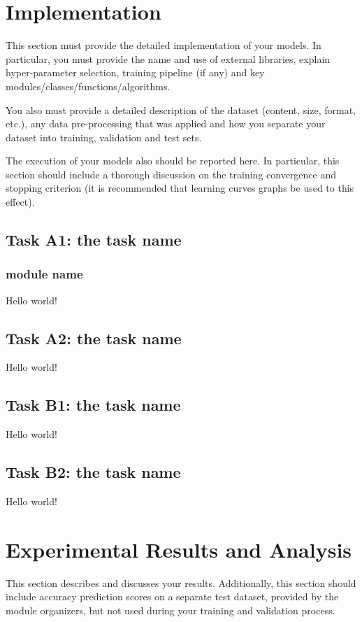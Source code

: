 \documentclass{article}
\begin{document}
\section{Implementation}
\label{sec:implementation_of_models}
    This section must provide the detailed implementation of your models. In particular, you must provide the name and use of external libraries, explain hyper-parameter selection, training pipeline (if any) and key modules/classes/functions/algorithms.
    
    You also must provide a detailed description of the dataset (content, size, format, etc.), any data pre-processing that was applied and how you separate your dataset into training, validation and test sets.
    
    The execution of your models also should be reported here. In particular, this section should include a thorough discussion on the training convergence and stopping criterion (it is recommended that learning curves graphs be used to this effect).

    \subsection{Task A1: the task name}
    \label{ssec:models_A1}
    \subsubsection{module name}
    Hello world!
    \subsection{Task A2: the task name}
    \label{ssec:models_A1}
    Hello world!
    \subsection{Task B1: the task name}
    \label{ssec:models_A1}
    Hello world!
    \subsection{Task B2: the task name}
    \label{ssec:models_A1}
    Hello world!

\section{Experimental Results and Analysis}
\label{sec:experimental_results}
    This section describes and discusses your results. Additionally, this section should include accuracy prediction scores on a separate test dataset, provided by the module organizers, but not used during your training and validation process.
    
\end{document}
